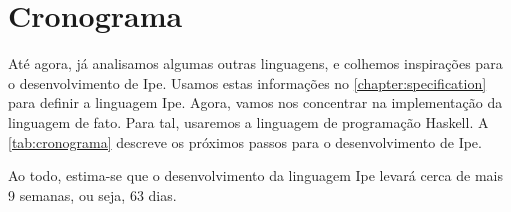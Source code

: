 
\chapter{Cronograma}

Até agora, já analisamos algumas outras linguagens, e colhemos inspirações para
o desenvolvimento de Ipe. Usamos estas informações no \autoref{chapter:specification}
para definir a linguagem Ipe. Agora, vamos nos concentrar na implementação da
linguagem de fato. Para tal, usaremos a linguagem de programação Haskell.  A
\autoref{tab:cronograma} descreve os próximos passos para o desenvolvimento de Ipe.

\begin{table}[htb]
    \caption{Cronograma de desenvolvimento para a linguagem Ipe}
    \label{tab:cronograma}
\end{table}

Ao todo, estima-se que o desenvolvimento da linguagem Ipe levará cerca de mais 9
semanas, ou seja, 63 dias.
